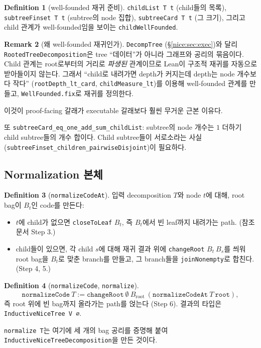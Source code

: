 \documentclass[11pt]{article}
\theoremstyle{definition}
\newtheorem{definition}{Definition}[section]
\newtheorem{remark}[definition]{Remark}
\theoremstyle{plain}
\newcommand{\lean}[1]{\texttt{#1}}
\begin{document}
\begin{definition}[well-founded 재귀 준비]
\label{nice:def:wellfounded}
\lean{childList T t} (child들의 목록), \lean{subtreeFinset T t} (subtree의
node 집합), \lean{subtreeCard T t} (그 크기), 그리고 child 관계가
well-founded임을 보이는 \lean{childWellFounded}.
\end{definition}

\begin{remark}[왜 well-founded 재귀인가]
\label{nice:rem:wfrecursion}
\lean{DecompTree} (\S\ref{nice:sec:exec})와 달리 \lean{RootedTreeDecomposition}은
tree ``데이터''가 아니라 그래프와 공리의 묶음이다. Child 관계는 root로부터의
거리로 \emph{파생된} 관계이므로 Lean이 구조적 재귀를 자동으로 받아들이지
않는다. 그래서 ``child로 내려가면 depth가 커지는데 depth는 node 개수보다 작다''
(\lean{rootDepth\_lt\_card}, \lean{childMeasure\_lt})를 이용해 well-founded
관계를 만들고, \lean{WellFounded.fix}로 재귀를 정의한다.

이것이 proof-facing 갈래가 executable 갈래보다 훨씬 무거운 근본 이유다.
\end{remark}

또 \lean{subtreeCard\_eq\_one\_add\_sum\_childList}: subtree의 node 개수는
$1$ 더하기 child subtree들의 개수 합이다. Child subtree들이 서로소라는
사실 (\lean{subtreeFinset\_children\_pairwiseDisjoint})이 필요하다.

\subsection{Normalization 본체}

\begin{definition}[\lean{normalizeCodeAt}]
\label{nice:def:normalizecodeat}
입력 decomposition $T$와 node $t$에 대해, root bag이 $B_t$인 code를 만든다:
\begin{itemize}
  \item $t$에 child가 없으면 \lean{closeToLeaf} $B_t$, 즉 $B_t$에서 빈 leaf까지
    내려가는 path. (참조 문서 Step 3.)
  \item child들이 있으면, 각 child $s$에 대해 재귀 결과 위에
    \lean{changeRoot} $B_t\ B_s$를 씌워 root bag을 $B_t$로 맞춘 branch를 만들고,
    그 branch들을 \lean{joinNonempty}로 합친다. (Step 4, 5.)
\end{itemize}
\end{definition}

\begin{definition}[\lean{normalizeCode}, \lean{normalize}]
\label{nice:def:normalizecode}
\[
  \lean{normalizeCode}\ T := \lean{changeRoot}\ \emptyset\ B_{\text{root}}\
    (\lean{normalizeCodeAt}\ T\ \lean{root}),
\]
즉 root 위에 빈 bag까지 올라가는 path를 얹는다 (Step 6). 결과의 타입은
\lean{InductiveNiceTree V ∅}.

\lean{normalize T}는 여기에 세 개의 bag 공리를 증명해 붙여
\lean{InductiveNiceTreeDecomposition}을 만든 것이다.
\end{definition}
\end{document}
